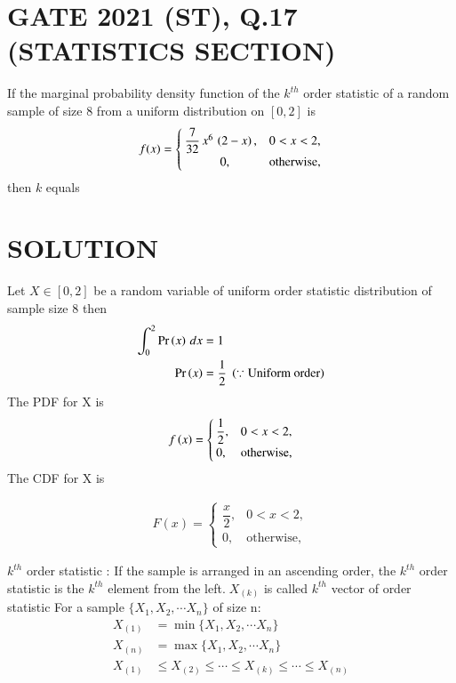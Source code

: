 \documentclass[journal,12pt,twocolumn]{IEEEtran}
\begin{document}
\section{GATE 2021 (ST), Q.17 (STATISTICS SECTION)} 
If the marginal probability density function of the $k^{th}$ order statistic of a 
random sample of size 8 from a uniform distribution on $[0,2]$ is
\[
  f(x) =
  \begin{cases}
   \dfrac{7}{32}\,x^{6}\,\left(2-x\right),  & 0<x<2, \\ 
      \hspace{1cm}   0,               & \text{otherwise,} 
  \end{cases}
\]
then $k$ equals \underline{\hspace{3cm}}
\bigskip
\section{SOLUTION}
Let $X\in[0,2]$ be a random variable of uniform order statistic distribution of sample size 8 then
\begin{align}
 \int_{0}^{2} \Pr\left(x\right)\,dx &= 1 \\
 \Pr\left(x\right)                  &= \dfrac{1}{2}\;\left(\because \text{Uniform order}\right)
\end{align}
The PDF for X is 
\begin{align}
f\left(x\right) = 
 \begin{cases}
  \dfrac{1}{2},      &0<x<2, \\ 
     0, &\text{otherwise,}
 \end{cases} \label{d}
\end{align}
 The CDF for X is 
 
 \begin{align}
 F(x) = 
 \begin{cases}
  \dfrac{x}{2},      &0<x<2, \\ 
     0, &\text{otherwise,}
 \end{cases} \label{e}
 \end{align}
 
\newpage

\begin{definition}
$k^{th}$ order statistic : If the sample is arranged in an ascending order, the $k^{th}$ order statistic is the $k^{th}$ element from the left.$\;X_{(k)}$ is called $k^{th}$ vector of order statistic  
For a sample $\{X_1, X_2, \cdots X_n\}$ of size n:
\begin{align}
\nonumber  X_{(1)} &= \min{\{X_1, X_2, \cdots X_n\}}\\
\nonumber  X_{(n)} &= \max{\{X_1, X_2, \cdots X_n\}} \\
\nonumber  X_{(1)} &\leq X_{(2)}\leq \cdots\leq X_{(k)}\leq \cdots \leq X_{(n)} 
\end{align}
\end{definition}
\end{document}
